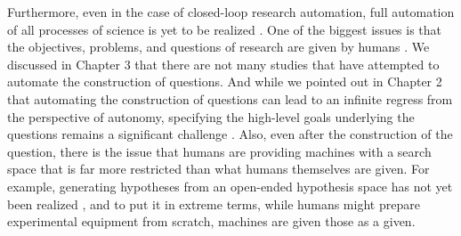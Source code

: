 Furthermore, even in the case of closed-loop research automation,  full automation of all processes of science is yet to be realized \cite{zenil2023,coley2020autonomous,coley2020autonomousII}. One of the biggest issues is that the objectives, problems, and questions of research are given by humans \cite{coley2020autonomousII}. We discussed in Chapter 3 that there are not many studies that have attempted to automate the construction of questions. And while we pointed out in Chapter 2 that automating the construction of questions can lead to an infinite regress from the perspective of autonomy, specifying the high-level goals underlying the questions remains a significant challenge \cite{coley2020autonomousII}. Also, even after the construction of the question, there is the issue that humans are providing machines with a search space that is far more restricted than what humans themselves are given. For example, generating hypotheses from an open-ended hypothesis space has not yet been realized \cite{zenil2023,coley2020autonomousII}, and to put it in extreme terms, while humans might prepare experimental equipment from scratch, machines are given those as a given. 




